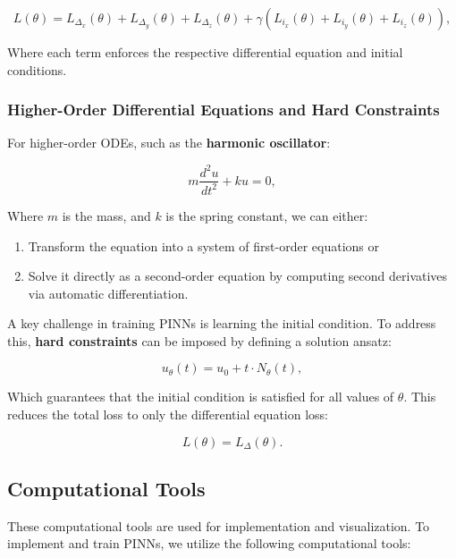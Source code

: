 \documentclass{article}
\begin{document}
\begin{equation}
    L(\theta) = L_{\Delta_x}(\theta) + L_{\Delta_y}(\theta) + L_{\Delta_z}(\theta) + \gamma \left(L_{i_x}(\theta) + L_{i_y}(\theta) + L_{i_z}(\theta)\right),
\end{equation}

Where each term enforces the respective differential equation and initial conditions.

\subsubsection{Higher-Order Differential Equations and Hard Constraints}
For higher-order ODEs, such as the \textbf{harmonic oscillator}:

\begin{equation}
    m \frac{d^2 u}{dt^2} + k u = 0,
\end{equation}

Where $m$ is the mass, and $k$ is the spring constant, we can either:
\begin{enumerate}
    \item Transform the equation into a system of first-order equations or
    \item Solve it directly as a second-order equation by computing second derivatives via automatic differentiation.
\end{enumerate}

A key challenge in training PINNs is learning the initial condition. To address this, \textbf{hard constraints} can be imposed by defining a solution ansatz:

\begin{equation}
    u_{\theta}(t) = u_0 + t \cdot N_{\theta}(t),
\end{equation}

Which guarantees that the initial condition is satisfied for all values of $\theta$. This reduces the total loss to only the differential equation loss:

\begin{equation}
    L(\theta) = L_{\Delta}(\theta).
\end{equation}

\subsection{Computational Tools}
These computational tools are used for implementation and visualization.
To implement and train PINNs, we utilize the following computational tools:
\end{document}

